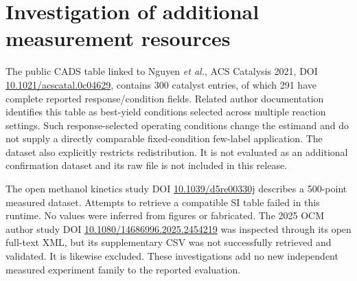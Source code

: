 \section{Investigation of additional measurement resources}
The public CADS table linked to Nguyen \emph{et al.}, ACS Catalysis 2021, DOI \href{https://doi.org/10.1021/acscatal.0c04629}{10.1021/acscatal.0c04629}, contains 300 catalyst entries, of which 291 have complete reported response/condition fields. Related author documentation identifies this table as best-yield conditions selected across multiple reaction settings. Such response-selected operating conditions change the estimand and do not supply a directly comparable fixed-condition few-label application. The dataset also explicitly restricts redistribution. It is not evaluated as an additional confirmation dataset and its raw file is not included in this release.

The open methanol kinetics study DOI \href{https://doi.org/10.1039/d5re00330j}{10.1039/d5re00330j} describes a 500-point measured dataset. Attempts to retrieve a compatible SI table failed in this runtime. No values were inferred from figures or fabricated. The 2025 OCM author study DOI \href{https://doi.org/10.1080/14686996.2025.2454219}{10.1080/14686996.2025.2454219} was inspected through its open full-text XML, but its supplementary CSV was not successfully retrieved and validated. It is likewise excluded. These investigations add no new independent measured experiment family to the reported evaluation.
